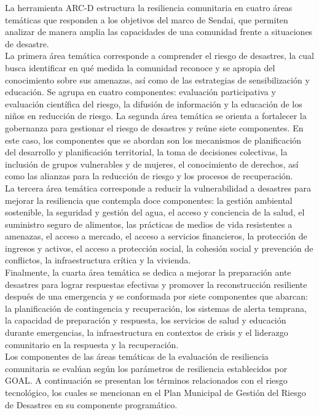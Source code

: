\documentclass[
  letterpaper,
]{book}
\begin{document}
La herramienta ARC-D estructura la resiliencia comunitaria en cuatro
áreas temáticas que responden a los objetivos del marco de Sendai, que
permiten analizar de manera amplia las capacidades de una comunidad
frente a situaciones de desastre.\\
La primera área temática corresponde a comprender el riesgo de
desastres, la cual busca identificar en qué medida la comunidad reconoce
y se apropia del conocimiento sobre sus amenazas, así como de las
estrategias de sensibilización y educación. Se agrupa en cuatro
componentes: evaluación participativa y evaluación científica del
riesgo, la difusión de información y la educación de los niños en
reducción de riesgo. La segunda área temática se orienta a fortalecer la
gobernanza para gestionar el riesgo de desastres y reúne siete
componentes. En este caso, los componentes que se abordan son los
mecanismos de planificación del desarrollo y planificación territorial,
la toma de decisiones colectivas, la inclusión de grupos vulnerables y
de mujeres, el conocimiento de derechos, así como las alianzas para la
reducción de riesgo y los procesos de recuperación.\\
La tercera área temática corresponde a reducir la vulnerabilidad a
desastres para mejorar la resiliencia que contempla doce componentes: la
gestión ambiental sostenible, la seguridad y gestión del agua, el acceso
y conciencia de la salud, el suministro seguro de alimentos, las
prácticas de medios de vida resistentes a amenazas, el acceso a mercado,
el acceso a servicios financieros, la protección de ingresos y activos,
el acceso a protección social, la cohesión social y prevención de
conflictos, la infraestructura crítica y la vivienda.\\
Finalmente, la cuarta área temática se dedica a mejorar la preparación
ante desastres para lograr respuestas efectivas y promover la
reconstrucción resiliente después de una emergencia y se conformada por
siete componentes que abarcan: la planificación de contingencia y
recuperación, los sistemas de alerta temprana, la capacidad de
preparación y respuesta, los servicios de salud y educación durante
emergencias, la infraestructura en contextos de crisis y el liderazgo
comunitario en la respuesta y la recuperación.\\
Los componentes de las áreas temáticas de la evaluación de resiliencia
comunitaria se evalúan según los parámetros de resiliencia establecidos
por GOAL. A continuación se presentan los términos relacionados con el
riesgo tecnológico, los cuales se mencionan en el Plan Municipal de
Gestión del Riesgo de Desastres en su componente programático.
\end{document}
